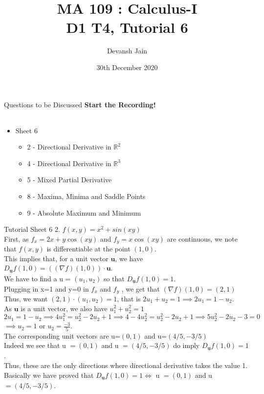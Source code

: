 \documentclass[aspectratio=169]{beamer}
\title{MA 109 : Calculus-I\\ D1 T4, Tutorial 6}
\author{Devansh Jain}
\date[30-12-2020]{30th December 2020}
\institute[IITB]{IIT Bombay}
\newcommand{\R}{\mathbb{R}}
\begin{document}
\begin{frame}
    \titlepage
\end{frame}

\begin{frame}{Questions to be Discussed}
    \center\textbf{Start the Recording!} \\~\\
    \begin{itemize}
        \item Sheet 6
            \begin{itemize}
                \item 2 - Directional Derivative in $\R^2$
                \item 4 - Directional Derivative in $\R^3$
                \item 5 - Mixed Partial Derivative
                \item 8 - Maxima, Minima and Saddle Points
                \item 9 - Absolute Maximum and Minimum
            \end{itemize}
    \end{itemize}
\end{frame}

\begin{frame}{Tutorial Sheet 6}
    2. $f(x,y)=x^2+sin(xy)$ \\
    First, as $f_x = 2x + y \cos(xy)$ and $f_y = x \cos(xy)$ are continuous, we note that $f(x,y)$ is differentiable at the point $(1,0)$. \\
    This implies that, for a unit vector $\mathbf{u}$, we have $D_{\mathbf{\underline{u}}} f(1,0)= ((\nabla f)(1,0)) \cdot \mathbf{u}$. \\ 
    We have to find a u = $(u_1, u_2)$ so that $D_{\mathbf{\underline{u}}} f(1,0) = 1 $. \\
    Plugging in x=1 and y=0 in $f_x$ and $f_y$ , we get that $(\nabla f)(1,0)=(2,1)$ \\
    Thus, we want $(2,1) \cdot (u_1, u_2) = 1$, that is $2u_1 + u_2 = 1 \implies 2u_1 = 1 - u_2$. \\
    As $\mathbf{u}$ is a unit vector, we also have $u_1^2+u_2^2=1$ \\
    $2u_1=1-u_2 \implies 4u_1^2=u_2^2-2u_2+1 \implies 4-4u_2^2=u_2^2-2u_2+1 \implies 5u_2^2-2u_2-3=0$ \\
    $\implies u_2=1$ or $u_2=\frac{-3}{5}.$ \\
    The corresponding unit vectors are u=$(0,1)$ and u=$(4/5, -3/5)$ \\
    Indeed we see that u $=(0,1)$ and u $=(4/5, -3/5)$ do imply $D_{\mathbf{\underline{u}}} f(1,0) = 1 $. \\
    Thus, these are the only directions where directional derivative takes the value 1. \\
    Basically we have proved that $D_{\mathbf{\underline{u}}} f(1,0) = 1 \iff $ u $=(0,1)$ and u $=(4/5, -3/5)$.
\end{frame}
\end{document}
